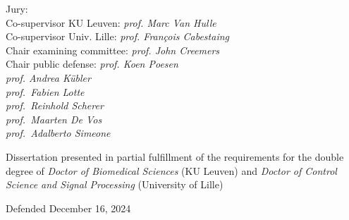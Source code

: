 \begin{titlepage}
    \vfill
    \begin{minipage}[b]{.5\textwidth}
      \raggedright
      \small
      Jury: \\
      Co-supervisor KU Leuven: \emph{prof. Marc Van Hulle} \\
      Co-supervisor Univ. Lille: \emph{prof. François Cabestaing} \\
      Chair examining committee: \emph{prof. John Creemers} \\
      Chair public defense: \emph{prof. Koen Poesen} \\
      \emph{prof. Andrea K\"ubler} \\
      \emph{prof.\ Fabien Lotte} \\
      \emph{prof.\ Reinhold Scherer} \\
      \emph{prof.\ Maarten De Vos} \\
      \emph{prof.\ Adalberto Simeone}
    \end{minipage}\hfill%
    \begin{minipage}[b]{.31\textwidth}
        \raggedright
        \small
        Dissertation presented in partial fulfillment of the requirements for
        the double degree of \emph{Doctor of Biomedical Sciences} (KU Leuven)
        and \emph{Doctor of Control Science and Signal Processing} (University
        of Lille)
    \end{minipage}
    \bigskip

    \centering
    Defended December 16, 2024

\end{titlepage}
